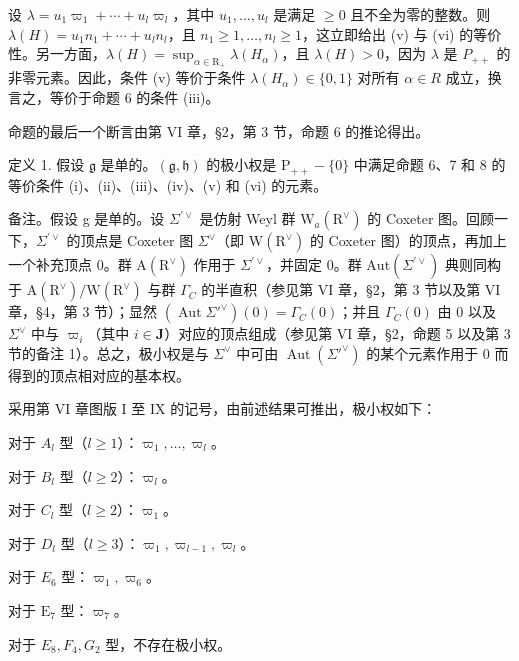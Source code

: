设 \(\lambda = u_{1}\varpi_{1} + \cdots + u_{l}\varpi_{l}\)，其中 \(u_{1}, \ldots, u_{l}\) 是满足 \(\geq 0\) 且不全为零的整数。则 \(\lambda(H) = u_{1}n_{1} + \cdots + u_{l}n_{l}\)，且 \(n_{1} \geq 1, \ldots, n_{l} \geq 1\)，这立即给出 (v) 与 (vi) 的等价性。另一方面，\(\lambda(H) = \sup_{\alpha \in \mathrm{R}_{+}} \lambda(H_{\alpha})\)，且 \(\lambda(H) > 0\)，因为 \(\lambda\) 是 \(P_{++}\) 的非零元素。因此，条件 (v) 等价于条件 \(\lambda(H_{\alpha}) \in \{0, 1\}\) 对所有 \(\alpha \in R\) 成立，换言之，等价于命题 6 的条件 (iii)。

命题的最后一个断言由第 VI 章，§2，第 3 节，命题 6 的推论得出。

定义 1. 假设 \(\mathfrak{g}\) 是单的。\((\mathfrak{g},\mathfrak{h})\) 的极小权是 \(\mathrm{P}_{++} - \{0\}\) 中满足命题 6、7 和 8 的等价条件 (i)、(ii)、(iii)、(iv)、(v) 和 (vi) 的元素。

备注。假设 g 是单的。设 \(\Sigma^{\prime\vee}\) 是仿射 Weyl 群 \(\mathrm{W}_{a}(\mathrm{R}^{\vee})\) 的 Coxeter 图。回顾一下，\(\Sigma^{\prime\vee}\) 的顶点是 Coxeter 图 \(\Sigma^{\vee}\)（即 \(\mathrm{W}(\mathrm{R}^{\vee})\) 的 Coxeter 图）的顶点，再加上一个补充顶点 0。群 \(\mathrm{A}(\mathrm{R}^{\vee})\) 作用于 \(\Sigma^{\prime\vee}\)，并固定 0。群 \(\mathrm{Aut}(\Sigma^{\prime\vee})\) 典则同构于 \(\mathrm{A}(\mathrm{R}^{\vee})/\mathrm{W}(\mathrm{R}^{\vee})\) 与群 \(\Gamma_{C}\) 的半直积（参见第 VI 章，§2，第 3 节以及第 VI 章，§4，第 3 节）；显然 \((\operatorname{Aut} \Sigma'^{\vee})(0) = \Gamma_C(0)\)；并且 \(\Gamma_C(0)\) 由 0 以及 \(\Sigma^{\vee}\) 中与 \(\varpi_i\)（其中 \(i \in \mathbf{J}\)）对应的顶点组成（参见第 VI 章，§2，命题 5 以及第 3 节的备注 1）。总之，极小权是与 \(\Sigma^{\vee}\) 中可由 \(\operatorname{Aut}(\Sigma'^{\vee})\) 的某个元素作用于 0 而得到的顶点相对应的基本权。

采用第 VI 章图版 I 至 IX 的记号，由前述结果可推出，极小权如下：

对于 \(A_{l}\) 型（\(l \geq 1\)）：\(\varpi_{1}, \ldots, \varpi_{l}\)。

对于 \(B_{l}\) 型（\(l \geq 2\)）：\(\varpi_{l}\)。

对于 \(C_{l}\) 型（\(l \geq 2\)）：\(\varpi_{1}\)。

对于 \(D_{l}\) 型（\(l \geq 3\)）：\(\varpi_{1}, \varpi_{l-1}, \varpi_{l}\)。

对于 \(E_{6}\) 型：\(\varpi_{1}, \varpi_{6}\)。

对于 \(\mathrm{E}_7\) 型：\(\varpi_7\)。

对于 \(E_{8}, F_{4}, G_{2}\) 型，不存在极小权。

